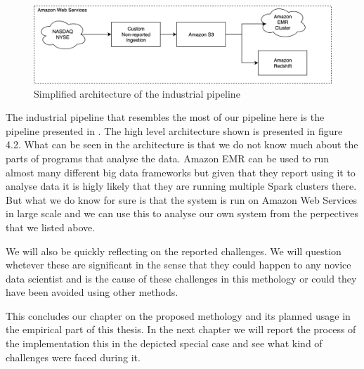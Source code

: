 \begin{figure}[ht!]
    \includegraphics[scale=0.50]{images/example2} 
    \centering
    \caption{Simplified architecture of the industrial pipeline}
\end{figure}

The industrial pipeline that resembles the most of our pipeline here is the pipeline presented in \cite{snively}.
The high level architecture shown is presented in figure 4.2.
What can be seen in the architecture is that we do not know much about the parts of programs that analyse the data.
Amazon EMR can be used to run almost many different big data frameworks but given that they report using it to analyse data it is higly likely that they are running multiple Spark clusters there.
But what we do know for sure is that the system is run on Amazon Web Services in large scale and we can use this to analyse our own system from the perpectives that we listed above.


We will also be quickly reflecting on the reported challenges.
We will question whetever these are significant in the sense that they could happen to any novice data scientist and is the cause of these challenges in this methology or could they have been avoided using other methods.

This concludes our chapter on the proposed methology and its planned usage in the empirical part of this thesis.%
In the next chapter we will report the process of the implementation this in the depicted special case and see what kind of challenges were faced during it.



